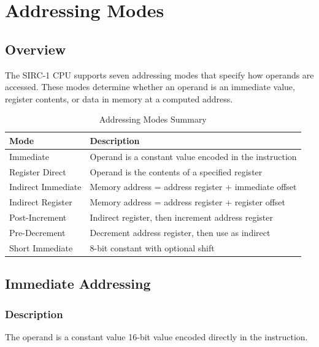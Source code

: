 \chapter{Addressing Modes}
\label{ch:addressing-modes}

\section{Overview}

The SIRC-1 CPU supports seven addressing modes that specify how operands are accessed. These modes determine whether an
operand is an immediate value, register contents, or data in memory at a computed address.

\begin{table}[H]
	\centering
	\begin{tabular}{lp{8cm}}
		\toprule
		\textbf{Mode}      & \textbf{Description}                                   \\
		\midrule
		Immediate          & Operand is a constant value encoded in the instruction \\
		Register Direct    & Operand is the contents of a specified register        \\
		Indirect Immediate & Memory address = address register + immediate offset   \\
		Indirect Register  & Memory address = address register + register offset    \\
		Post-Increment     & Indirect register, then increment address register     \\
		Pre-Decrement      & Decrement address register, then use as indirect       \\
		Short Immediate    & 8-bit constant with optional shift                     \\
		\bottomrule
	\end{tabular}
	\caption{Addressing Modes Summary}
	\label{tab:addr-modes}
\end{table}

\section{Immediate Addressing}

\subsection{Description}

The operand is a constant value 16-bit value encoded directly in the instruction.

